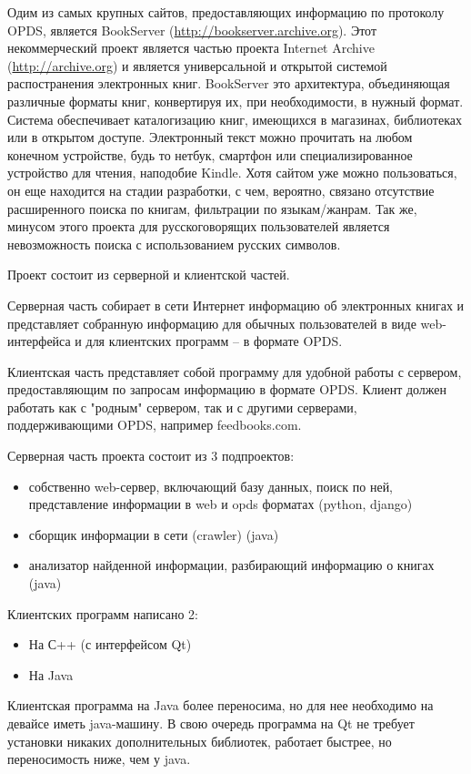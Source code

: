 \documentclass[a4paper]{report}
\begin{document}
Одим из самых крупных сайтов, предоставляющих информацию по протоколу OPDS, является BookServer (\url{http://bookserver.archive.org}).
Этот некоммерческий проект является частью проекта Internet Archive (\url{http://archive.org}) и является универсальной и открытой системой распостранения электронных книг. BookServer это архитектура, объединяющая различные форматы книг, конвертируя их, при необходимости, в нужный формат. Система обеспечивает каталогизацию книг, имеющихся в магазинах, библиотеках или в открытом доступе. Электронный текст можно прочитать на любом конечном устройстве, будь то нетбук, смартфон или специализированное устройство для чтения, наподобие Kindle. Хотя сайтом уже можно пользоваться, он еще находится на стадии разработки, с чем, вероятно, связано отсутствие расширенного поиска по книгам, фильтрации по языкам/жанрам. Так же, минусом этого проекта для русскоговорящих пользователей является невозможность поиска с использованием русских символов.

Проект состоит из серверной и клиентской частей.

Серверная часть собирает в сети Интернет информацию об электронных книгах и представляет собранную информацию для обычных пользователей в виде web-интерфейса и для клиентских программ -- в формате OPDS.

Клиентская часть представляет собой программу для удобной работы с сервером, предоставляющим по запросам информацию в формате OPDS. Клиент должен работать как с "родным" сервером, так и с другими серверами, поддерживающими OPDS, например feedbooks.com.

Серверная часть проекта состоит из 3 подпроектов:
\begin{itemize}
	\item собственно web-сервер, включающий базу данных, поиск по ней, представление информации в web и opds форматах (python, django)
	\item сборщик информации в сети (crawler) (java)
	\item анализатор найденной информации, разбирающий информацию о книгах (java) 
\end{itemize}
Клиентских программ написано 2:
\begin{itemize}
	\item На С++ (с интерфейсом Qt)
	\item На Java 
\end{itemize}

Клиентская программа на Java более переносима, но для нее необходимо на девайсе иметь java-машину. В свою очередь программа на Qt не требует установки никаких дополнительных библиотек, работает быстрее, но переносимость ниже, чем у java.
		
\end{document}
